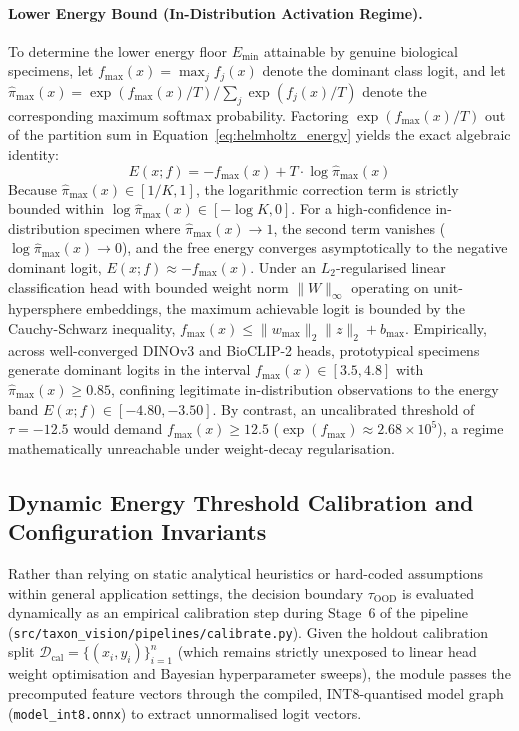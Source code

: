 \paragraph{Lower Energy Bound (In-Distribution Activation Regime).}
To determine the lower energy floor $E_{\min}$ attainable by genuine biological specimens, let $f_{\max}(x) = \max_j f_j(x)$ denote the dominant class logit, and let $\hat{\pi}_{\max}(x) = \exp(f_{\max}(x)/T) / \sum_j \exp(f_j(x)/T)$ denote the corresponding maximum softmax probability. Factoring $\exp(f_{\max}(x)/T)$ out of the partition sum in Equation~\ref{eq:helmholtz_energy} yields the exact algebraic identity:
\begin{equation}
E(x; f) = -f_{\max}(x) + T \cdot \log \hat{\pi}_{\max}(x)
\label{eq:energy_identity}
\end{equation}
Because $\hat{\pi}_{\max}(x) \in [1/K, 1]$, the logarithmic correction term is strictly bounded within $\log \hat{\pi}_{\max}(x) \in [-\log K, 0]$. For a high-confidence in-distribution specimen where $\hat{\pi}_{\max}(x) \to 1$, the second term vanishes ($\log \hat{\pi}_{\max}(x) \to 0$), and the free energy converges asymptotically to the negative dominant logit, $E(x; f) \approx -f_{\max}(x)$. Under an $L_2$-regularised linear classification head with bounded weight norm $\|W\|_\infty$ operating on unit-hypersphere embeddings, the maximum achievable logit is bounded by the Cauchy-Schwarz inequality, $f_{\max}(x) \le \|w_{\max}\|_2 \|z\|_2 + b_{\max}$. Empirically, across well-converged DINOv3 and BioCLIP-2 heads, prototypical specimens generate dominant logits in the interval $f_{\max}(x) \in [3.5, 4.8]$ with $\hat{\pi}_{\max}(x) \ge 0.85$, confining legitimate in-distribution observations to the energy band $E(x; f) \in [-4.80, -3.50]$. By contrast, an uncalibrated threshold of $\tau = -12.5$ would demand $f_{\max}(x) \ge 12.5$ ($\exp(f_{\max}) \approx 2.68 \times 10^5$), a regime mathematically unreachable under weight-decay regularisation.

\subsection{Dynamic Energy Threshold Calibration and Configuration Invariants}
\label{sec:dynamic_ood_calibration}

Rather than relying on static analytical heuristics or hard-coded assumptions within general application settings, the decision boundary $\tau_{\text{OOD}}$ is evaluated dynamically as an empirical calibration step during Stage~6 of the pipeline (\nolinkurl{src/taxon_vision/pipelines/calibrate.py}). Given the holdout calibration split $\mathcal{D}_{\text{cal}} = \{(x_i, y_i)\}_{i=1}^n$ (which remains strictly unexposed to linear head weight optimisation and Bayesian hyperparameter sweeps), the module passes the precomputed feature vectors through the compiled, INT8-quantised model graph (\nolinkurl{model_int8.onnx}) to extract unnormalised logit vectors. 

